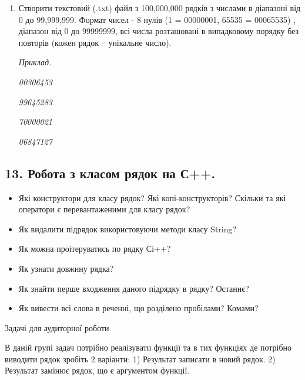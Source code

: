 \documentclass[]{article}
\makeatletter
\newcommand{\xslalph}[1]{\expandafter\@xslalph\csname c@#1\endcsname}
\newcommand{\@xslalph}[1]{%
    \ifcase#1\or а\or б\or в\or г\or д\or e\or є\or ж\or з\or i%
    \or й\or к\or л\or м\or н\or о\or п\or р\or с\or т%
    \or у\or ф\or х\or ц\or ч\or ш\or ю\or я\or аа\or бб\or вв%
    \else\@ctrerr\fi%
}
\makeatother
\begin{document}
\begin{enumerate}
\begin{enumerate}[label=\xslalph*)]
\begin{enumerate}
\begin{enumerate}[label=\xslalph*)]
\begin{enumerate}
\item
Створити текстовий (.txt) файл з 100,000,000 рядків з числами
в діапазоні від 0 до 99,999,999. Формат чисел - 8 нулів (1 = 00000001, 65535 = 00065535) , діапазон
від 0 до 99999999, всі числа розташовані в випадковому порядку без
повторів (кожен рядок -- унікальне число).

\emph{Приклад.}

\emph{00306453 }

\emph{99645283 }

\emph{70000021 }

\emph{06847127 }
\end{enumerate}


\newpage
\subsection{13. Робота з класом рядок на С++.}
\setcounter{subsection}{1}


\begin{itemize}

\item
  Які конструктори для класу рядок? Які копі-конструкторів? Скільки та
  які оператори є перевантаженими для класу рядок?
\item
  Як видалити підрядок використовуючи методи класу String?
\item
  Як можна проітеруватись по рядку Сі++?
\item
  Як узнати довжину рядка?
\item
  Як знайти перше входження даного підрядку в рядку? Останнє?
\item
  Як вивести всі слова в реченні, що розділено пробілами? Комами?
\end{itemize}

Задачі для аудиторної роботи

В даній групі задач потрібно реалізувати функції та в тих функціях де
потрібно виводити рядок зробіть 2 варіанти: 1) Результат записати в
новий рядок. 2) Результат замінює рядок, що є аргументом функції.


\end{enumerate}
\end{enumerate}
\end{enumerate}
\end{enumerate}
\end{document}
